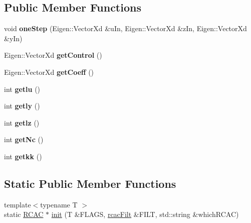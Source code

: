 \subsection*{Public Member Functions}
\begin{DoxyCompactItemize}
\item 
\mbox{\label{class_r_c_a_c_a956bb6a557f050d3808d5392fd3add20}} 
void {\bfseries one\+Step} (Eigen\+::\+Vector\+Xd \&u\+In, Eigen\+::\+Vector\+Xd \&z\+In, Eigen\+::\+Vector\+Xd \&y\+In)
\item 
\mbox{\label{class_r_c_a_c_ad93e5753d1810d7c3b2f6fbf56857a51}} 
Eigen\+::\+Vector\+Xd {\bfseries get\+Control} ()
\item 
\mbox{\label{class_r_c_a_c_a5223fc3dbd1a3b4b1577dfd83af76f7e}} 
Eigen\+::\+Vector\+Xd {\bfseries get\+Coeff} ()
\item 
\mbox{\label{class_r_c_a_c_ae854b722c35cb1d8506ddacf6a89f795}} 
int {\bfseries getlu} ()
\item 
\mbox{\label{class_r_c_a_c_a1066229fd21de368018ae43747f34622}} 
int {\bfseries getly} ()
\item 
\mbox{\label{class_r_c_a_c_a80a0a753247f22bea53bc5c0b76403a1}} 
int {\bfseries getlz} ()
\item 
\mbox{\label{class_r_c_a_c_a5e3d7aedab3b39415315f1c6b1920ef0}} 
int {\bfseries get\+Nc} ()
\item 
\mbox{\label{class_r_c_a_c_a4e710eaf32fac967dc76a8d851a51211}} 
int {\bfseries getkk} ()
\end{DoxyCompactItemize}
\subsection*{Static Public Member Functions}
\begin{DoxyCompactItemize}
\item 
{\footnotesize template$<$typename T $>$ }\\static \hyperlink{class_r_c_a_c}{R\+C\+AC} $\ast$ \hyperlink{class_r_c_a_c_af7b7133b676886d5010be725291c1a1d}{init} (T \&F\+L\+A\+GS, \hyperlink{structrcac_filt}{rcac\+Filt} \&F\+I\+LT, std\+::string \&which\+R\+C\+AC)
\end{DoxyCompactItemize}
